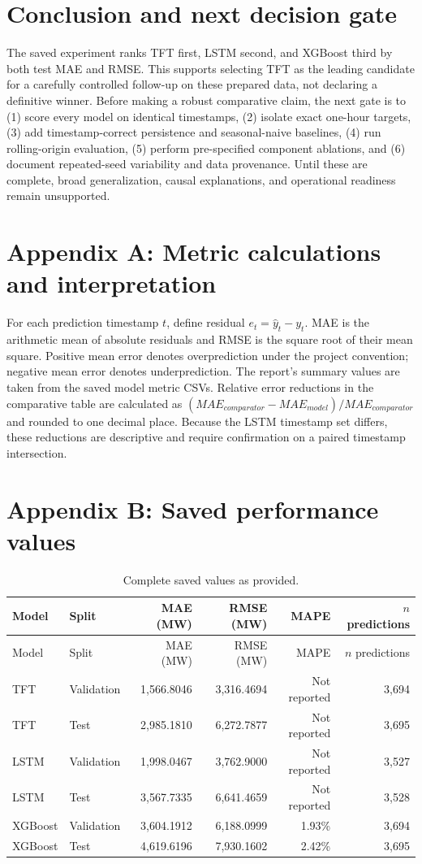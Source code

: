 \documentclass[12pt,a4paper]{article}
\begin{document}
\newpage
\section{Conclusion and next decision gate}
The saved experiment ranks TFT first, LSTM second, and XGBoost third by both test MAE and RMSE. This supports selecting TFT as the leading candidate for a carefully controlled follow-up on these prepared data, not declaring a definitive winner. Before making a robust comparative claim, the next gate is to (1) score every model on identical timestamps, (2) isolate exact one-hour targets, (3) add timestamp-correct persistence and seasonal-naive baselines, (4) run rolling-origin evaluation, (5) perform pre-specified component ablations, and (6) document repeated-seed variability and data provenance. Until these are complete, broad generalization, causal explanations, and operational readiness remain unsupported.

\appendix
\newpage
\section{Appendix A: Metric calculations and interpretation}
For each prediction timestamp $t$, define residual $e_t=\hat y_t-y_t$. MAE is the arithmetic mean of absolute residuals and RMSE is the square root of their mean square. Positive mean error denotes overprediction under the project convention; negative mean error denotes underprediction. The report's summary values are taken from the saved model metric CSVs. Relative error reductions in the comparative table are calculated as $(MAE_{comparator}-MAE_{model})/MAE_{comparator}$ and rounded to one decimal place. Because the LSTM timestamp set differs, these reductions are descriptive and require confirmation on a paired timestamp intersection.

\section{Appendix B: Saved performance values}
\begin{longtable}{llrrrr}
\caption{Complete saved values as provided.}\\
\toprule Model & Split & MAE (MW) & RMSE (MW) & MAPE & $n$ predictions\\\midrule\endfirsthead
\toprule Model & Split & MAE (MW) & RMSE (MW) & MAPE & $n$ predictions\\\midrule\endhead
TFT&Validation&1,566.8046&3,316.4694&Not reported&3,694\\
TFT&Test&2,985.1810&6,272.7877&Not reported&3,695\\
LSTM&Validation&1,998.0467&3,762.9000&Not reported&3,527\\
LSTM&Test&3,567.7335&6,641.4659&Not reported&3,528\\
XGBoost&Validation&3,604.1912&6,188.0999&1.93\%&3,694\\
XGBoost&Test&4,619.6196&7,930.1602&2.42\%&3,695\\
\bottomrule\end{longtable}
\end{document}
